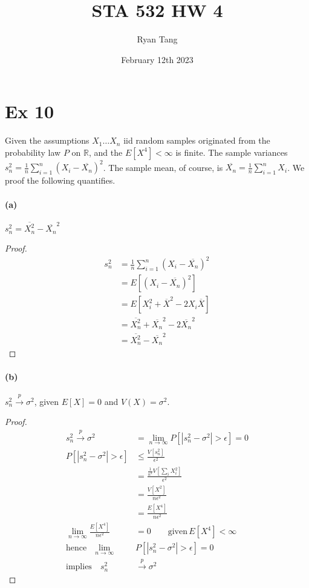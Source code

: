 \documentclass[11pt, letterpaper]{article}
\author{Ryan Tang}
\title{STA 532 HW 4}
\date{February 12th 2023}
\begin{document}
\maketitle

\section{Ex 10}
Given the assumptions $X_1 \dots X_n$ iid random samples originated from the probability law $P$ on $\mathbb{R}$, and the $E[X^4] <\infty$ is finite. The sample variances $s^2_n = \frac{1}{n} \sum_{i=1}^n (X_i - \overline{X_n})^2$. The sample mean, of course, is $\overline{X_n} = \frac{1}{n} \sum_{i=1}^n X_i$. We proof the following quantifies.
\paragraph{(a)} $s^2_n = \overline{X^2_n} - \overline{X_n}^2$
\begin{proof}\begin{align*}
    s^2_n &= \frac{1}{n} \sum_{i=1}^n (X_i - \overline{X_n})^2 \\
        &= E[(X_i - \overline{X_n})^2] \\
        &= E[X_i^2 + \overline{X}^2 - 2X_i\overline{X}] \\
        &= \overline{X^2_n} + \overline{X_n}^2 - 2\overline{X_n}^2 \\
        &= \overline{X^2_n} - \overline{X_n}^2
\end{align*}\end{proof}

\paragraph{(b)} $s^2_n \xrightarrow{p} \sigma^2$, given $E[X] = 0$ and $V(X) = \sigma^2$.
\begin{proof}\begin{align*}
    s^2_n \xrightarrow{p} \sigma^2 &= \lim_{n \rightarrow \infty} P[|s^2_n - \sigma^2| > \epsilon] = 0 \\
    P[|s^2_n - \sigma^2| > \epsilon] &\leq \frac{V[s^2_n]}{\epsilon^2} \\
        &= \frac{\frac{1}{n^2}V[\sum_i X_i^2]}{\epsilon^2} \\
        &= \frac{V[X^2]}{n\epsilon^2} \\
        &= \frac{E[X^4]}{n\epsilon^2} \\
    \lim_{n \rightarrow \infty} \frac{E[X^4]}{n\epsilon^2} &= 0 \quad\quad \text{given}\, E[X^4] < \infty \\
    \text{hence}\quad \lim_{n \rightarrow \infty} &P[|s^2_n - \sigma^2| > \epsilon] = 0 \\
    \text{implies}\quad s^2_n &\xrightarrow{p} \sigma^2
\end{align*}\end{proof}
\end{document}
